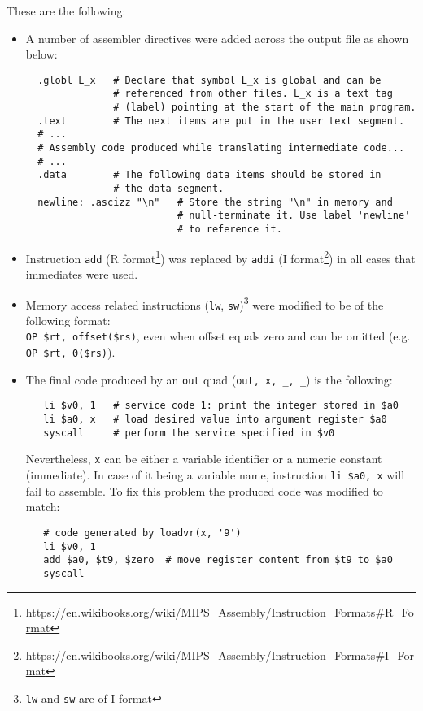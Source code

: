 \documentclass{article}
\def\code#1{\texttt{#1}} %
\begin{document}
These are the following:
\begin{itemize}
 \item A number of assembler directives were added across the output file as shown below:
  \begin{lstlisting}
  .globl L_x   # Declare that symbol L_x is global and can be
               # referenced from other files. L_x is a text tag
               # (label) pointing at the start of the main program.
  .text        # The next items are put in the user text segment.
  # ...
  # Assembly code produced while translating intermediate code...
  # ...
  .data        # The following data items should be stored in
               # the data segment.
  newline: .ascizz "\n"   # Store the string "\n" in memory and
                          # null-terminate it. Use label 'newline'
                          # to reference it.
  \end{lstlisting}
  \newpage
 \item Instruction \code{add} (R format\footnote{\url{https://en.wikibooks.org/wiki/MIPS_Assembly/Instruction_Formats\#R_Format}})
       was replaced by \code{addi} (I format\footnote{\url{https://en.wikibooks.org/wiki/MIPS_Assembly/Instruction_Formats\#I_Format}})
       in all cases that immediates were used.
 \item Memory access related instructions (\code{lw}, \code{sw})\footnote{\code{lw} and \code{sw} are of I format}
       were modified to be of the following format:\\ \verb|OP $rt, offset($rs)|, even when offset equals zero
       and can be omitted (e.g. \verb|OP $rt, 0($rs)|).
 \item The final code produced by an \code{out} quad (\verb|out, x, _, _|) is the following:
   \begin{lstlisting}
   li $v0, 1   # service code 1: print the integer stored in $a0
   li $a0, x   # load desired value into argument register $a0
   syscall     # perform the service specified in $v0
  \end{lstlisting}
       Nevertheless, \code{x} can be either a variable identifier or a numeric constant (immediate).
       In case of it being a variable name, instruction \code{li \$a0, x} will fail to assemble.
       To fix this problem the produced code was modified to match:
  \begin{lstlisting}
   # code generated by loadvr(x, '9')
   li $v0, 1
   add $a0, $t9, $zero  # move register content from $t9 to $a0
   syscall
  \end{lstlisting}

\end{itemize}
\end{document}
